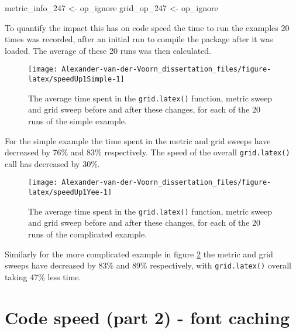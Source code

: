 \documentclass[]{article}
\newenvironment{Shaded}{\begin{snugshade}}{\end{snugshade}}
\newcommand{\DecValTok}[1]{\textcolor[rgb]{0.00,0.00,0.81}{#1}}
\newcommand{\StringTok}[1]{\textcolor[rgb]{0.31,0.60,0.02}{#1}}
\newcommand{\NormalTok}[1]{#1}
\begin{document}
\begin{Shaded}
\begin{Highlighting}[]
\NormalTok{metric_info_}\DecValTok{247}\NormalTok{ <-}\StringTok{ }\NormalTok{op_ignore}
\NormalTok{grid_op_}\DecValTok{247}\NormalTok{ <-}\StringTok{ }\NormalTok{op_ignore}
\end{Highlighting}
\end{Shaded}

To quantify the impact this has on code speed the time to run the
examples 20 times was recorded, after an initial run to compile the
package after it was loaded. The average of these 20 runs was then
calculated.

\begin{figure}

{\centering \texttt{[image: Alexander-van-der-Voorn\_dissertation\_files/figure-latex/speedUp1Simple-1]} 

}

\caption{The average time spent in the \texttt{grid.latex()} function, metric sweep and grid sweep before and after these changes, for each of the 20 runs of the simple example.}\label{fig:speedUp1Simple}
\end{figure}

For the simple example the time spent in the metric and grid sweeps have
decreased by 76\% and 83\% respectively. The speed of the overall
\texttt{grid.latex()} call has decreased by 30\%.

\begin{figure}

{\centering \texttt{[image: Alexander-van-der-Voorn\_dissertation\_files/figure-latex/speedUp1Yee-1]} 

}

\caption{The average time spent in the \texttt{grid.latex()} function, metric sweep and grid sweep before and after these changes, for each of the 20 runs of the complicated example.}\label{fig:speedUp1Yee}
\end{figure}

Similarly for the more complicated example in figure
\ref{fig:speedUp1Yee} the metric and grid sweeps have decreased by 83\%
and 89\% respectively, with \texttt{grid.latex()} overall taking 47\%
less time.

\newpage{}

\section{Code speed (part 2) - font
caching}\label{code-speed-part-2---font-caching}
\end{document}
